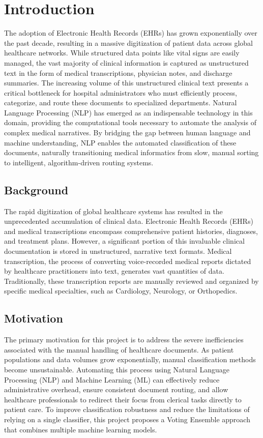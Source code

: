 \chapter{Introduction}
The adoption of Electronic Health Records (EHRs) has grown exponentially over the past decade, resulting in a massive digitization of patient data across global healthcare networks. While structured data points like vital signs are easily managed, the vast majority of clinical information is captured as unstructured text in the form of medical transcriptions, physician notes, and discharge summaries. The increasing volume of this unstructured clinical text presents a critical bottleneck for hospital administrators who must efficiently process, categorize, and route these documents to specialized departments. Natural Language Processing (NLP) has emerged as an indispensable technology in this domain, providing the computational tools necessary to automate the analysis of complex medical narratives. By bridging the gap between human language and machine understanding, NLP enables the automated classification of these documents, naturally transitioning medical informatics from slow, manual sorting to intelligent, algorithm-driven routing systems.

\section{Background}
The rapid digitization of global healthcare systems has resulted in the unprecedented accumulation of clinical data. Electronic Health Records (EHRs) and medical transcriptions encompass comprehensive patient histories, diagnoses, and treatment plans. However, a significant portion of this invaluable clinical documentation is stored in unstructured, narrative text formats. Medical transcription, the process of converting voice-recorded medical reports dictated by healthcare practitioners into text, generates vast quantities of data. Traditionally, these transcription reports are manually reviewed and organized by specific medical specialties, such as Cardiology, Neurology, or Orthopedics. 

\section{Motivation}
The primary motivation for this project is to address the severe inefficiencies associated with the manual handling of healthcare documents. As patient populations and data volumes grow exponentially, manual classification methods become unsustainable. Automating this process using Natural Language Processing (NLP) and Machine Learning (ML) can effectively reduce administrative overhead, ensure consistent document routing, and allow healthcare professionals to redirect their focus from clerical tasks directly to patient care. To improve classification robustness and reduce the limitations of relying on a single classifier, this project proposes a Voting Ensemble approach that combines multiple machine learning models.

